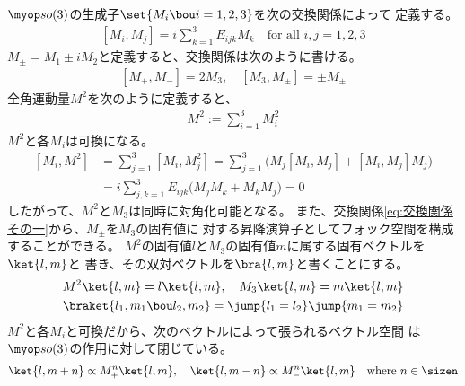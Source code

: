 {	$\lieso(3)$の生成子$\set{M_i\bou i=1,2,3}$を次の交換関係によって
	定義する。
	\begin{equation*}\begin{split}
		[M_i,M_j] = i\sum_{k=1}^3E_{ijk}M_k \quad\text{for all } i,j=1,2,3
	\end{split}\end{equation*}
	$M_\pm=M_1\pm iM_2$と定義すると、交換関係は次のように書ける。
	\begin{equation}\label{eq:交換関係その一}\begin{split}
		[M_+,M_-] = 2M_3,\quad [M_3,M_\pm] = \pm M_\pm
	\end{split}\end{equation}
	全角運動量$M^2$を次のように定義すると、
	\begin{equation*}\begin{split}
		M^2 := \sum_{i=1}^3 M_i^2
	\end{split}\end{equation*}
	$M^2$と各$M_i$は可換になる。
	\begin{equation*}\begin{split}
		[M_i,M^2] &= \sum_{j=1}^3 [M_i,M_j^2]
		= \sum_{j=1}^3 \bigl(M_j[M_i,M_j] + [M_i,M_j]M_j\bigr) \\
		& = i\sum_{j,k=1}^3 E_{ijk}\bigl(M_jM_k + M_kM_j\bigr) = 0
	\end{split}\end{equation*}
	したがって、$M^2$と$M_3$は同時に対角化可能となる。
	また、交換関係\eqref{eq:交換関係その一}から、$M_\pm$を$M_3$の固有値に
	対する昇降演算子としてフォック空間を構成することができる。
	$M^2$の固有値$l$と$M_3$の固有値$m$に属する固有ベクトルを$\ket{l,m}$と
	書き、その双対ベクトルを$\bra{l,m}$と書くことにする。
	\begin{equation*}\begin{split}
		M^2\ket{l,m} = l\ket{l,m},\quad M_3\ket{l,m} = m\ket{l,m} \\ 
		\braket{l_1,m_1\bou l_2,m_2} = \jump{l_1=l_2}\jump{m_1=m_2}
	\end{split}\end{equation*}
	$M^2$と各$M_i$と可換だから、次のベクトルによって張られるベクトル空間
	は$\lieso(3)$の作用に対して閉じている。
	\begin{equation*}\begin{split}
		\ket{l,m + n}\propto M_+^n\ket{l,m},\quad
		\ket{l,m - n}\propto M_-^n\ket{l,m} \quad\text{where } n\in\sizen
	\end{split}\end{equation*}

}
